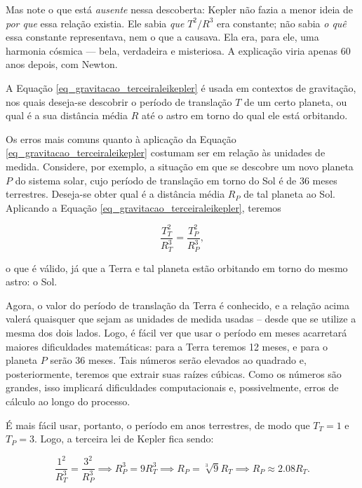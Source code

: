 Mas note o que está \textit{ausente} nessa descoberta: Kepler não fazia a menor ideia de
\textit{por que} essa relação existia. Ele sabia \textit{que} $T^2/R^3$ era constante;
não sabia \textit{o quê} essa constante representava, nem o que a causava. Ela era, para
ele, uma harmonia cósmica --- bela, verdadeira e misteriosa. A explicação viria apenas
60 anos depois, com Newton.
 






 A Equação \eqref{eq_gravitacao_terceiraleikepler} é usada em contextos de gravitação, nos quais deseja-se descobrir o período de translação $T$ de um certo planeta, ou qual é a sua distância média $R$ até o astro em torno do qual ele está orbitando.




Os erros mais comuns quanto à aplicação da Equação \eqref{eq_gravitacao_terceiraleikepler} costumam ser em relação às unidades de medida. Considere, por exemplo, a situação em que se descobre um novo planeta $P$ do sistema solar, cujo período de translação em torno do Sol é de 36 meses terrestres. Deseja-se obter qual é a distância média $R_P$ de tal planeta ao Sol. Aplicando a Equação \eqref{eq_gravitacao_terceiraleikepler}, teremos

$$ \dfrac{T_T^2}{R_T^3} = \dfrac{T^2_P}{R^3_P},  $$

\noindent o que é válido, já que a Terra e tal planeta estão orbitando em torno do mesmo astro: o Sol. 

Agora, o valor do período de translação da Terra é conhecido, e a relação acima valerá quaisquer que sejam as unidades de medida usadas -- desde que se utilize a mesma dos dois lados. Logo, é fácil ver que usar o período em meses acarretará maiores dificuldades matemáticas: para a Terra teremos 12 meses, e para o planeta $P$ serão 36 meses. Tais números serão elevados ao quadrado e, posteriormente, teremos que extrair suas raízes cúbicas. Como os números são grandes, isso implicará dificuldades computacionais e, possivelmente, erros de cálculo ao longo do processo.

É mais fácil usar, portanto, o período em anos terrestres, de modo que $T_T = 1$ e $T_P=3$. Logo, a terceira lei de Kepler fica sendo:

$$ \dfrac{1^2}{R_T^3} = \dfrac{3^2}{R^3_P} \implies  R^3_P = 9  R_T^3 \implies R_P = \sqrt[3]{9} R_T \implies \boxed{R_P \approx 2.08R_T.}  $$

